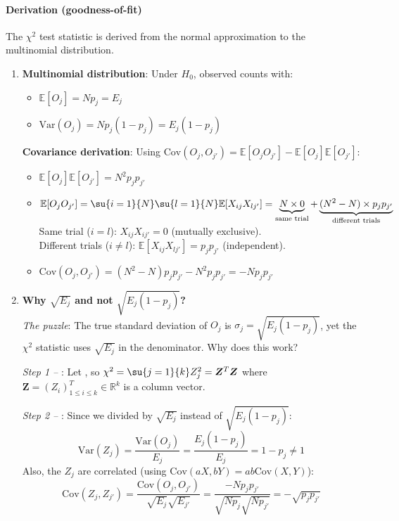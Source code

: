 \paragraph{Derivation (goodness-of-fit)}
The $\chi^2$ test statistic is derived from the normal approximation to the multinomial distribution.
\begin{enumerate}
    \item \textbf{Multinomial distribution}: Under $H_0$, observed counts  with:
        \begin{itemize}
            \item $\mathbb{E}[O_j] = Np_j = E_j$
            \item $\text{Var}(O_j) = Np_j(1-p_j) = E_j(1-p_j)$
        \end{itemize}
        \textbf{Covariance derivation}: Using $\text{Cov}(O_j, O_{j'}) = \mathbb{E}[O_j O_{j'}] - \mathbb{E}[O_j]\mathbb{E}[O_{j'}]$:
        \begin{itemize}
            \item $\mathbb{E}[O_j]\mathbb{E}[O_{j'}] = N^2p_jp_{j'}$
            \item $\mathbb{E}[O_j O_{j'}] = \su{i=1}{N}\su{l=1}{N}\mathbb{E}[X_{ij}X_{lj'}]
                = \underbrace{N \times 0}_{\text{same trial}} + \underbrace{(N^2-N) \times p_jp_{j'}}_{\text{different trials}}$\\
                Same trial ($i=l$): $X_{ij}X_{ij'}=0$ (mutually exclusive).\\
                Different trials ($i\neq l$): $\mathbb{E}[X_{ij}X_{lj'}] = p_jp_{j'}$ (independent).
            \item $\text{Cov}(O_j, O_{j'}) = (N^2-N)p_jp_{j'} - N^2p_jp_{j'} = -Np_jp_{j'}$
        \end{itemize}
    \item \textbf{Why $\sqrt{E_j}$ and not $\sqrt{E_j(1-p_j)}$?}\\
        \textit{The puzzle}: The true standard deviation of $O_j$ is $\sigma_j = \sqrt{E_j(1-p_j)}$,
        yet the $\chi^2$ statistic uses $\sqrt{E_j}$ in the denominator. Why does this work?

        \textit{Step 1 -- }: Let , so
        $\chi^2 = \su{j=1}{k}Z_j^2 = \bm{Z}^T\bm{Z}$ where $\bm{Z} = \left(Z_i\right)_{1\leq i\leq k}^T \in \mathbb{R}^k$ is a column vector.

        \textit{Step 2 -- }: Since we divided by $\sqrt{E_j}$
        instead of $\sqrt{E_j(1-p_j)}$:
        $$\text{Var}(Z_j) = \dfrac{\text{Var}(O_j)}{E_j} = \dfrac{E_j(1-p_j)}{E_j} = 1-p_j \neq 1$$
        Also, the $Z_j$ are correlated (using $\text{Cov}(aX, bY) = ab\text{Cov}(X,Y)$):
        $$\text{Cov}(Z_j, Z_{j'}) = \dfrac{\text{Cov}(O_j, O_{j'})}{\sqrt{E_j}\sqrt{E_{j'}}}
        = \dfrac{-Np_jp_{j'}}{\sqrt{Np_j}\sqrt{Np_{j'}}} = -\sqrt{p_jp_{j'}}$$


\end{enumerate}
